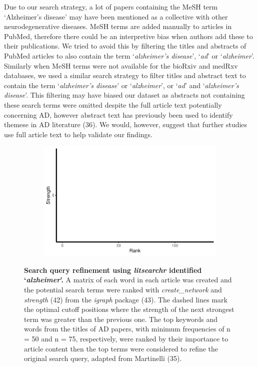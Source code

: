 \documentclass[
  a4paper,
]{article}
\begin{document}
Due to our search strategy, a lot of papers containing the MeSH term
`Alzheimer's disease' may have been mentioned as a collective with other
neurodegenerative diseases. MeSH terms are added manually to articles in
PubMed, therefore there could be an interpretive bias when authors add
these to their publications. We tried to avoid this by filtering the
titles and abstracts of PubMed articles to also contain the term
`\emph{alzheimer's disease}', `\emph{ad}' or `\emph{alzheimer}'.
Similarly when MeSH terms were not available for the bioRxiv and medRxv
databases, we used a similar search strategy to filter titles and
abstract text to contain the term `\emph{alzheimer's disease}' or
`\emph{alzheimer}', or `\emph{ad}' and `\emph{alzheimer's disease}'.
This filtering may have biased our dataset as abstracts not containing
these search terms were omitted despite the full article text
potentially concerning AD, however abstract text has previously been
used to identify themese in AD literature (36). We would, however,
suggest that further studies use full article text to help validate our
findings.

\begin{figure}

{\centering 

\begin{figure}[H]

{\centering \includegraphics{report_pdf_files/figure-pdf/fig-ad-search-terms-1.pdf}

}

\end{figure}

}

\caption{\label{fig-ad-search-terms}\textbf{Search query refinement
using \emph{litsearchr} identified `\emph{alzheimer}'.} A matrix of each
word in each article was created and the potential search terms were
ranked with \emph{create\_network} and \emph{strength} (42) from the
\emph{igraph} package (43). The dashed lines mark the optimal cutoff
positions where the strength of the next strongest term was greater than
the previous one. The top keywords and words from the titles of AD
papers, with minimum frequencies of n = 50 and n = 75, respectively,
were ranked by their importance to article content then the top terms
were considered to refine the original search query, adapted from
Martinelli (35).}

\end{figure}
\end{document}

